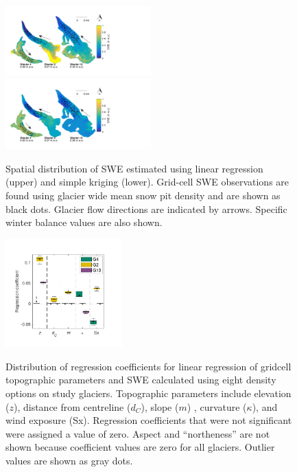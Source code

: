 \documentclass[twocolumn, letterpaper]{igs}
\begin{document}
\begin{figure}
	\centering
	\includegraphics[width =0.5\textwidth]{LR_map.pdf}\\
    \includegraphics[width =0.5\textwidth]{SK_map.pdf}\\
	\caption{Spatial distribution of SWE estimated using linear regression (upper) and simple kriging (lower). Grid-cell SWE observations are found using glacier wide mean snow pit density and are shown as black dots. Glacier flow directions are indicated by arrows. Specific winter balance values are also shown.}
	\label{fig:LR_SK_map}
\end{figure}


\begin{figure}
	\centering
	\includegraphics[width =0.4\textwidth]{BetaCoeffs.pdf}\\
	\caption{Distribution of regression coefficients for linear regression of gridcell topographic parameters and SWE calculated using eight density options on study glaciers. Topographic parameters include elevation ($z$), distance from centreline ($d_C$), slope ($m$) , curvature ($\kappa$), and wind exposure (Sx). Regression coefficients that were not significant were assigned a value of zero. Aspect and ``northeness'' are not shown because coefficient values are zero for all glaciers. Outlier values are shown as gray dots.}
	\label{fig:BetaCoeffs}
\end{figure}
\end{document}
